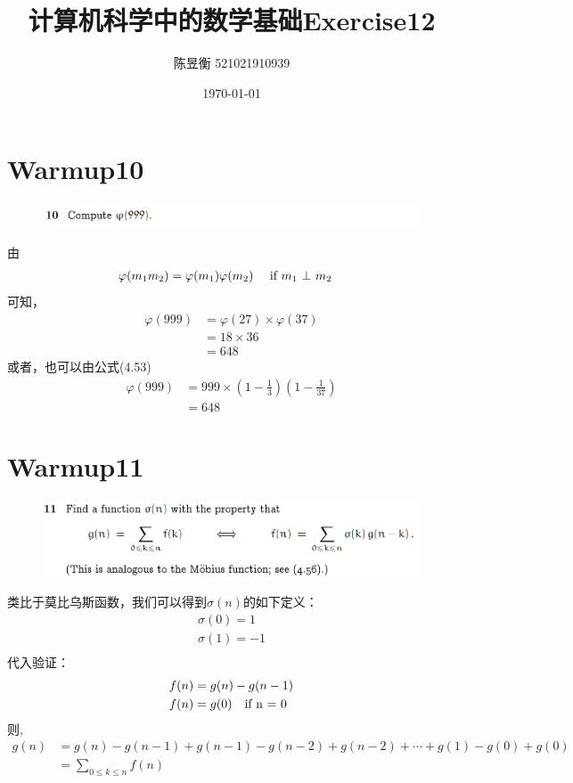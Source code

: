 \documentclass[]{article}
\title{计算机科学中的数学基础Exercise12}
\author{陈昱衡 521021910939}
\date{\today}
\begin{document}
\maketitle
\section*{Warmup10}
\begin{figure}[H]
    \includegraphics[scale = 0.6]{2023-03-23-10-17-02.png}
\end{figure}
由
\begin{align}
    \varphi(m_1 m_2) &= \varphi(m_1) \varphi(m_2) \text { \quad if  $m_1$ $\perp$ $m_2$}
\end{align}
可知，
\begin{align}
    \varphi(999) &= \varphi(27) \times \varphi(37)\\
    &= 18 \times 36\\
    &=648
\end{align}
或者，也可以由公式(4.53)
\begin{align}
    \varphi(999) &= 999 \times (1-\frac{1}{3})(1-\frac{1}{37})\\
    &=648
\end{align}

\section*{Warmup11}
\begin{figure}[H]
    \includegraphics[scale = 0.6]{2023-03-23-10-18-57.png}
\end{figure}
类比于莫比乌斯函数，我们可以得到$\sigma (n)$的如下定义：
\begin{align}
    \sigma (0) = 1 \\
    \sigma (1) = -1\\
\end{align}
代入验证：
\begin{align}
    f(n) &= g(n) - g(n-1)\\
    f(n) &= g(0) \text{\quad if n = 0} \\
\end{align}
则,
\begin{align}
    g(n) &= g(n) - g(n-1) + g(n-1) - g(n-2) + g(n-2) + \cdots + g(1) - g(0) + g(0)\\
    &= \sum_{0 \le k \le n} f(n)
\end{align}
\end{document}
